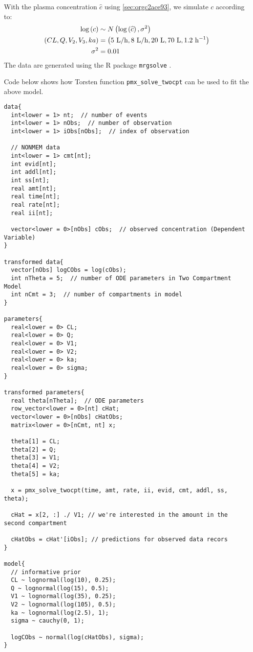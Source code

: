 \documentclass[12pt, reqno, oneside]{amsbook}
\numberwithin{equation}{chapter}
\numberwithin{figure}{chapter}
\numberwithin{table}{chapter}
\theoremstyle{remark}
\begin{document}
With the plasma concentration \(\hat{c}\) using
\ref{sec:orgc2ace93}, we simulate \(c\) according to:
\begin{align*}
  \log\left(c\right) &\sim N\left(\log\left(\widehat{c}\right),\sigma^2\right) \\
  \left(CL, Q, V_2, V_3, ka\right) &= \left(5\ {\rm L/h}, 8\  {\rm L/h}, 20\  {\rm L},  70\ {\rm L}, 1.2\ {\rm h^{-1}} \right) \\
  \sigma^2 &= 0.01
\end{align*}
The data are generated using the R package \texttt{mrgsolve} \cite{Baron000}.

Code below shows how Torsten function \texttt{pmx\_solve\_twocpt} can be used to fit the above model.

\begin{verbatim}
data{
  int<lower = 1> nt;  // number of events
  int<lower = 1> nObs;  // number of observation
  int<lower = 1> iObs[nObs];  // index of observation

  // NONMEM data
  int<lower = 1> cmt[nt];
  int evid[nt];
  int addl[nt];
  int ss[nt];
  real amt[nt];
  real time[nt];
  real rate[nt];
  real ii[nt];

  vector<lower = 0>[nObs] cObs;  // observed concentration (Dependent Variable)
}

transformed data{
  vector[nObs] logCObs = log(cObs);
  int nTheta = 5;  // number of ODE parameters in Two Compartment Model
  int nCmt = 3;  // number of compartments in model
}

parameters{
  real<lower = 0> CL;
  real<lower = 0> Q;
  real<lower = 0> V1;
  real<lower = 0> V2;
  real<lower = 0> ka;
  real<lower = 0> sigma;
}

transformed parameters{
  real theta[nTheta];  // ODE parameters
  row_vector<lower = 0>[nt] cHat;
  vector<lower = 0>[nObs] cHatObs;
  matrix<lower = 0>[nCmt, nt] x;

  theta[1] = CL;
  theta[2] = Q;
  theta[3] = V1;
  theta[4] = V2;
  theta[5] = ka;

  x = pmx_solve_twocpt(time, amt, rate, ii, evid, cmt, addl, ss, theta);

  cHat = x[2, :] ./ V1; // we're interested in the amount in the second compartment

  cHatObs = cHat'[iObs]; // predictions for observed data recors
}

model{
  // informative prior
  CL ~ lognormal(log(10), 0.25);
  Q ~ lognormal(log(15), 0.5);
  V1 ~ lognormal(log(35), 0.25);
  V2 ~ lognormal(log(105), 0.5);
  ka ~ lognormal(log(2.5), 1);
  sigma ~ cauchy(0, 1);

  logCObs ~ normal(log(cHatObs), sigma);
}
\end{verbatim}
\end{document}
